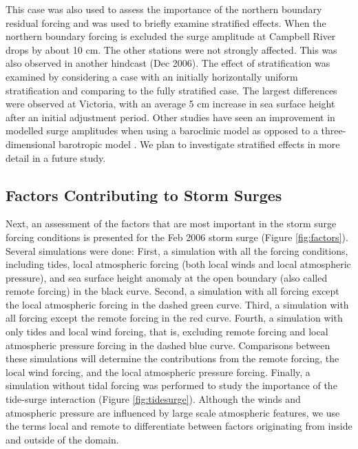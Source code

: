 \documentclass[letterpaper]{tATO2e}
\begin{document}
{\color{red} This case was also used to assess the importance of the northern boundary residual forcing and was used to briefly examine stratified effects. When the northern boundary forcing is excluded the surge amplitude at Campbell River drops by about 10 cm. The other stations were not strongly affected. This was also observed in another hindcast (Dec 2006). The effect of stratification was examined by considering a case with an initially horizontally uniform stratification and comparing to the fully stratified case. The largest differences were observed at Victoria, with an average 5 cm increase in sea surface height after an initial adjustment period. Other studies have seen an improvement in modelled surge amplitudes when using a baroclinic model as opposed to a three-dimensional barotropic model \citep{ma2015oceanic}. We plan to investigate stratified effects in more detail in a future study.} 

\subsection{Factors Contributing to Storm Surges}\label{sec:factors}

Next, an assessment of the factors that are most important in the storm surge forcing conditions is presented for the Feb 2006 storm surge (Figure \ref{fig:factors}). Several simulations were done: First, a simulation with all the forcing conditions, including tides, local atmospheric forcing (both local winds and local atmospheric pressure), and sea surface height anomaly at the open boundary (also called remote forcing) in the black curve. Second, a simulation with all forcing except the local atmospheric forcing in the dashed green curve. Third, a simulation with all forcing except the remote forcing in the red curve. Fourth, a simulation with only tides and local wind forcing, that is, excluding remote forcing and local atmospheric pressure forcing in the dashed blue curve. {\color{red} Comparisons between these simulations will determine the contributions from the remote forcing, the local wind forcing, and the local atmospheric pressure forcing.} Finally, a simulation without tidal forcing was performed to study the importance of the tide-surge interaction (Figure \ref{fig:tidesurge}).  {\color{red} Although the winds and atmospheric pressure are influenced by large scale atmospheric features, we use the terms local and remote to differentiate between factors originating from inside and outside of the domain.} 
\end{document}
